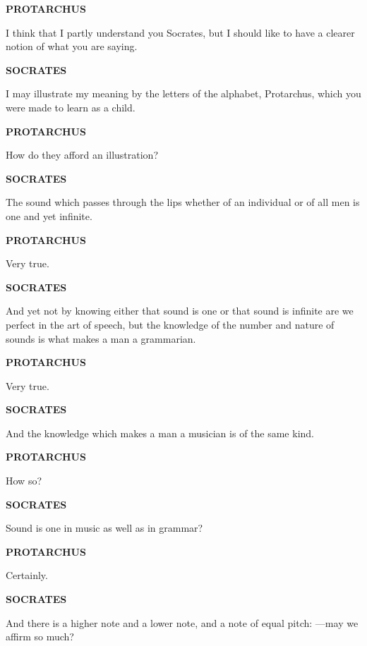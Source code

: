 \documentclass[11pt,letter]{article}
\begin{document}
\par \textbf{PROTARCHUS}
\par   I think that I partly understand you Socrates, but I should like to have a clearer notion of what you are saying.

\par \textbf{SOCRATES}
\par   I may illustrate my meaning by the letters of the alphabet, Protarchus, which you were made to learn as a child.

\par \textbf{PROTARCHUS}
\par   How do they afford an illustration?

\par \textbf{SOCRATES}
\par   The sound which passes through the lips whether of an individual or of all men is one and yet infinite.

\par \textbf{PROTARCHUS}
\par   Very true.

\par \textbf{SOCRATES}
\par   And yet not by knowing either that sound is one or that sound is infinite are we perfect in the art of speech, but the knowledge of the number and nature of sounds is what makes a man a grammarian.

\par \textbf{PROTARCHUS}
\par   Very true.

\par \textbf{SOCRATES}
\par   And the knowledge which makes a man a musician is of the same kind.

\par \textbf{PROTARCHUS}
\par   How so?

\par \textbf{SOCRATES}
\par   Sound is one in music as well as in grammar?

\par \textbf{PROTARCHUS}
\par   Certainly.

\par \textbf{SOCRATES}
\par   And there is a higher note and a lower note, and a note of equal pitch: —may we affirm so much?
\end{document}
